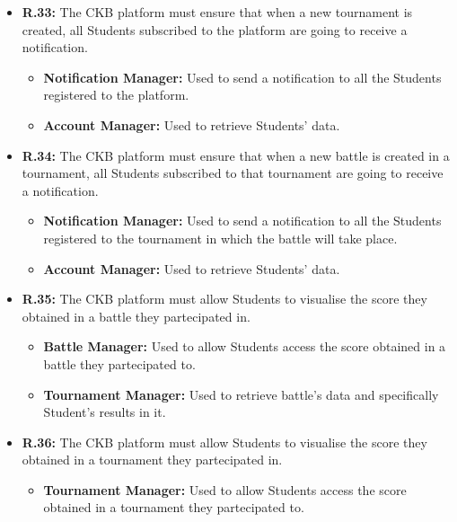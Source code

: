 \documentclass{article}
\begin{document}
{\begin{itemize}
\begin{itemize}
\begin{itemize}
              \item \textbf{Tournament Database:} Used to and store Studentd' scores.
          \end{itemize}
    \item \textbf{R.33:} The CKB platform must ensure that when a new tournament is created, all
          Students subscribed to the platform are going to receive a notification.
          \begin{itemize}
              \item \textbf{Notification Manager:} Used to send a notification to all the Students
              registered to the platform.
              \item \textbf{Account Manager:} Used to retrieve Students' data.
          \end{itemize}
    \item \textbf{R.34:} The CKB platform must ensure that when a new battle is created in a tournament,
          all Students subscribed to that tournament are going to receive a notification.
          \begin{itemize}
              \item \textbf{Notification Manager:} Used to send a notification to all the Students
              registered to the tournament in which the battle will take place.
              \item \textbf{Account Manager:} Used to retrieve Students' data.
          \end{itemize}
    \item \textbf{R.35:} The CKB platform must allow Students to visualise the score they obtained in a battle they partecipated in.
          \begin{itemize}
              \item \textbf{Battle Manager:} Used to allow Students access the score obtained
              in a battle they partecipated to.
              \item \textbf{Tournament Manager:} Used to retrieve battle's data and specifically
              Student's results in it.
          \end{itemize}
    \item \textbf{R.36:} The CKB platform must allow Students to visualise the score they obtained in a tournament they partecipated in.
          \begin{itemize}
            \item \textbf{Tournament Manager:} Used to allow Students access the score obtained
            in a tournament they partecipated to.

\end{itemize}
\end{itemize}
\end{itemize}}
\end{document}
